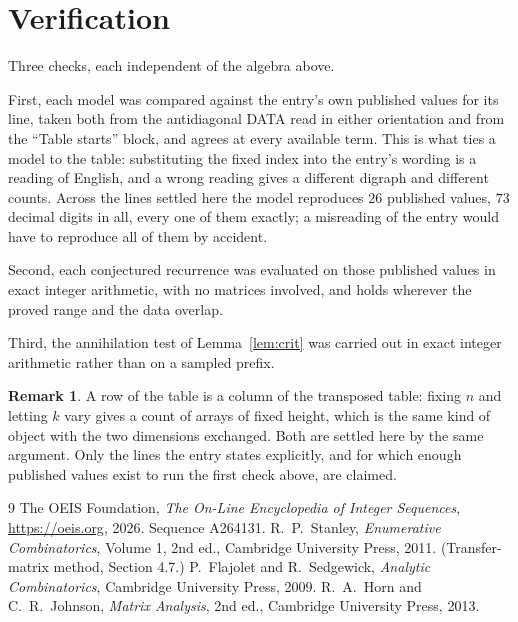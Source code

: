 \documentclass[11pt,a4paper]{article}
\theoremstyle{plain}
\theoremstyle{definition}
\newtheorem{remark}[theorem]{Remark}
\begin{document}
\section{Verification}

Three checks, each independent of the algebra above.

First, each model was compared against the entry's own published values for its line, taken
both from the antidiagonal DATA read in either orientation and from the ``Table starts''
block, and agrees at every available term. This is what ties a model to the table:
substituting the fixed index into the entry's wording is a reading of English, and a wrong
reading gives a different digraph and different counts. Across the lines settled here the
model reproduces $26$ published values, $73$ decimal digits in all, every one of
them exactly; a misreading of the entry would have to reproduce all of them by accident.

Second, each conjectured recurrence was evaluated on those published values in exact
integer arithmetic, with no matrices involved, and holds wherever the proved range and the
data overlap.

Third, the annihilation test of Lemma~\ref{lem:crit} was carried out in exact integer
arithmetic rather than on a sampled prefix.

\begin{remark}
A row of the table is a column of the transposed table: fixing $n$ and letting $k$ vary gives a
count of arrays of fixed height, which is the same kind of object with the two dimensions
exchanged. Both are settled here by the same argument. Only the lines the entry states
explicitly, and for which enough published values exist to run the first check above, are
claimed.
\end{remark}

\begin{thebibliography}{9}
 The OEIS Foundation, \emph{The On-Line Encyclopedia of Integer
Sequences}, \url{https://oeis.org}, 2026. Sequence A264131.
 R.~P.~Stanley, \emph{Enumerative Combinatorics}, Volume 1, 2nd ed.,
Cambridge University Press, 2011. (Transfer-matrix method, Section 4.7.)
 P.~Flajolet and R.~Sedgewick, \emph{Analytic Combinatorics}, Cambridge
University Press, 2009.
 R.~A.~Horn and C.~R.~Johnson, \emph{Matrix Analysis}, 2nd ed., Cambridge
University Press, 2013.
\end{thebibliography}
\end{document}
